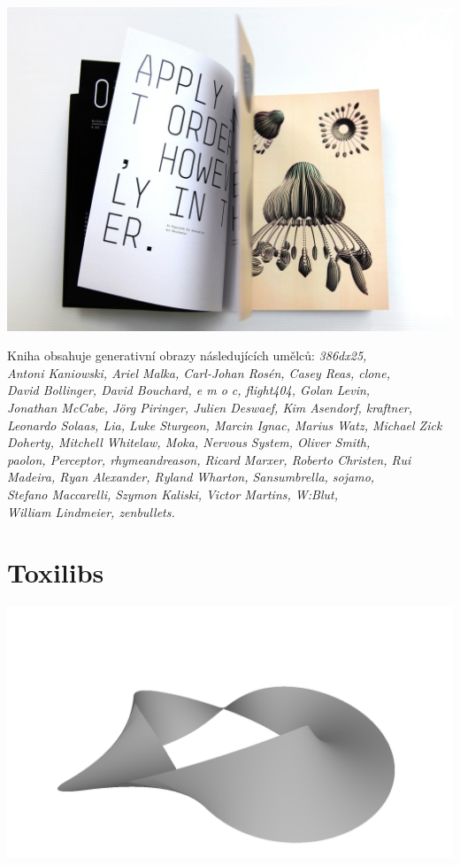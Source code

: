 \documentclass[10pt,twoside=true,open=right,cleardoublepage=empty,chapterprefix=true]{scrbook}
\newcommand{\oddil}[1]{\section{#1}\index{#1}\label{#1}}
\begin{document}
\begin{centering}
\includegraphics[width = 1\textwidth]{imgs/writtenimages.png}

\end{centering}

Kniha obsahuje generativní obrazy následujících umělců:
{\em 
386dx25, \\Antoni Kaniowski, Ariel Malka, Carl-Johan Rosén, Casey Reas, clone, \\David Bollinger, David Bouchard, e m o c, flight404, Golan Levin, \\Jonathan McCabe, Jörg Piringer, Julien Deswaef, Kim Asendorf, kraftner, Leonardo Solaas, Lia, Luke Sturgeon, Marcin Ignac, Marius Watz, Michael Zick Doherty, Mitchell Whitelaw, Moka, Nervous System, Oliver Smith, \\paolon, Perceptor, rhymeandreason, Ricard Marxer, Roberto Christen, Rui Madeira, Ryan Alexander, Ryland Wharton, Sansumbrella, sojamo, \\Stefano Maccarelli, Szymon Kaliski, Victor Martins, W:Blut, \\William Lindmeier, zenbullets.} 




\newpage
\oddil{Toxilibs}


\begin{center}
\includegraphics[width = 1\textwidth]{imgs/moebius.png}

\end{center}
\end{document}
